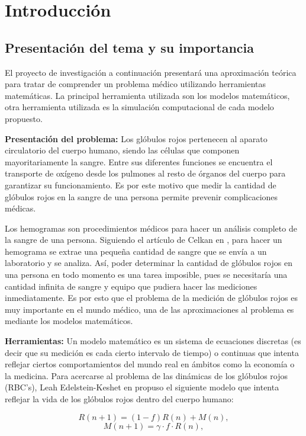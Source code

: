 \chapter{Introducción}\label{chap:intro}

\section{Presentación del tema y su importancia}

El proyecto de investigación a continuación presentará una aproximación teórica para tratar de comprender un problema médico utilizando herramientas matemáticas. La principal herramienta utilizada son los modelos matemáticos, otra herramienta utilizada es la simulación computacional de cada modelo propuesto. 

\textbf{Presentación del problema:} Los glóbulos rojos pertenecen al aparato circulatorio del cuerpo humano, siendo las células que componen mayoritariamente la sangre. Entre sus diferentes funciones se encuentra el transporte de oxígeno desde los pulmones al resto de órganos del cuerpo para garantizar su funcionamiento. Es por este motivo que medir la cantidad de glóbulos rojos en la sangre de una persona permite prevenir complicaciones médicas.

Los hemogramas son procedimientos médicos para hacer un análisis completo de la sangre de una persona. Siguiendo el artículo de Celkan en \cite{celkan2020does}, para hacer un hemograma se extrae una pequeña cantidad de sangre que se envía a un laboratorio y se analiza. Así, poder determinar la cantidad de glóbulos rojos en una persona en todo momento es una tarea imposible, pues se necesitaría una cantidad infinita de sangre y equipo que pudiera hacer las mediciones inmediatamente. Es por esto que el problema de la medición de glóbulos rojos es muy importante en el mundo médico, una de las aproximaciones al problema es mediante los modelos matemáticos.

\textbf{Herramientas:} Un modelo matemático es un sistema de ecuaciones discretas (es decir que su medición es cada cierto intervalo de tiempo) o continuas que intenta reflejar ciertos comportamientos del mundo real en ámbitos como la economía o la medicina. Para acercarse al problema de las dinámicas de los glóbulos rojos (RBC's), Leah Edelstein-Keshet en \cite{edelstein2005} propuso el siguiente modelo que intenta reflejar la vida de los glóbulos rojos dentro del cuerpo humano:

$$R(n+1)=(1-f)R(n)+M(n),$$
$$M(n+1)=\gamma \cdot f\cdot R(n),$$

